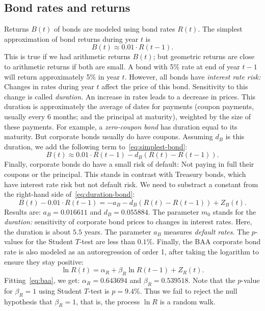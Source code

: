 \documentclass[12pt]{amsart}
\begin{document}
\subsection{Bond rates and returns} Returns $B(t)$ of bonds are modeled using bond rates $R(t)$. The simplest approximation of bond returns during year $t$ is 
\begin{equation}
\label{eq:simplest-bond}
B(t) \approx 0.01\cdot R(t-1).
\end{equation}
This is true if we had arithmetic returns $B(t)$; but geometric returns are close to arithmetic returns if both are small. A bond with 5\% rate at end of year $t-1$ will return approximately 5\% in year $t$. However, all bonds have {\it interest rate risk:} Changes in rates during year $t$ affect the price of this bond. Sensitivity to this change is called {\it duration.} An increase in rates leads to a decrease in prices. This duration is approximately the average of dates for payments (coupon payments, usually every 6 months; and the principal at maturity), weighted by the size of these payments. For example, a {\it zero-coupon bond} has duration equal to its maturity. But corporate bonds usually do have coupons. Assuming $d_B$ is this duration, we add the following term to~\eqref{eq:simplest-bond}:
\begin{equation}
\label{eq:duration-bond}
B(t) \approx 0.01\cdot R(t-1) - d_B(R(t) - R(t-1)).
\end{equation}
Finally, corporate bonds do have a small risk of default: Not paying in full their coupons or the principal. This stands in contrast with Treasury bonds, which have interest rate risk but not default risk. We need to substract a constant from the right-hand side of~\eqref{eq:duration-bond}:
\begin{equation}
\label{eq:B}
B(t) - 0.01\cdot R(t-1) = -a_B - d_B(R(t) - R(t-1)) + Z_B(t).
\end{equation}
Results are: $a_B = 0.016611$ and $d_B = 0.055884$. The parameter $m_0$ stands for the {\it duration:} sensitivity of corporate bond prices to changes in interest rates. Here, the duration is about $5.5$ years. The parameter $a_B$ measures {\it default rates}. The $p$-values for the Student $T$-test are less than $0.1\%$.  Finally, the BAA corporate bond rate is also modeled as an autoregression of order 1, after taking the logarithm to ensure they stay positive:
\begin{equation}
\label{eq:baa}
\ln R(t) = \alpha_R + \beta_R\ln R(t-1) + Z_R(t).
\end{equation}
Fitting~\eqref{eq:baa}, we get:  $\alpha_R = 0.643694$ and $\beta_R = 0.539518$. Note that the $p$-value for $\beta_R = 1$ using Student $T$-test is $p = 9.4\%$. Thus we fail to reject the null hypothesis that $\beta_R = 1$, that is, the process $\ln R$ is a random walk.
\end{document}
